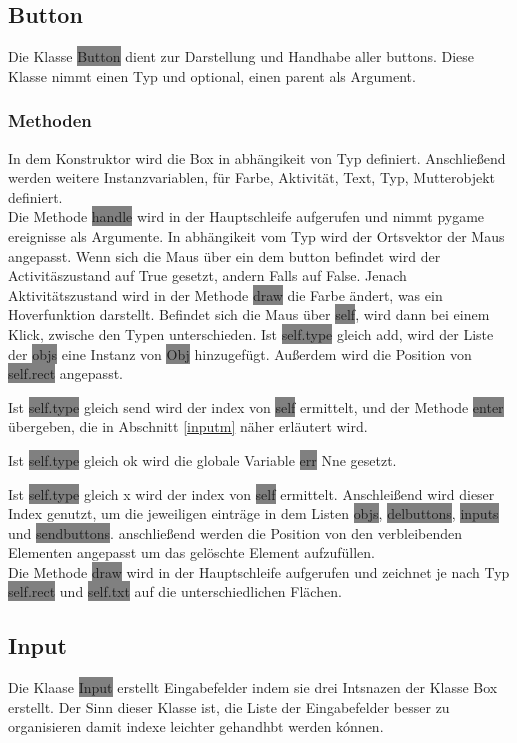 \documentclass[12pt]{article}
\begin{document}
\subsection{Button}
Die Klasse \colorbox{gray}{Button} dient zur Darstellung und Handhabe aller buttons.
Diese Klasse nimmt einen Typ und optional, einen parent als Argument.
\subsubsection{Methoden}
In dem Konstruktor wird die Box in abhängikeit von Typ definiert.
Anschließend werden weitere Instanzvariablen, für Farbe, Aktivität, Text, Typ, Mutterobjekt definiert.
\\

Die Methode \colorbox{gray}{handle} wird in der Hauptschleife aufgerufen und nimmt pygame ereignisse als Argumente.
In abhängikeit vom Typ wird der Ortsvektor der Maus angepasst.
Wenn sich die Maus über ein dem button befindet wird der Activitäszustand auf True gesetzt, andern Falls auf False.
Jenach Aktivitätszustand wird in der Methode \colorbox{gray}{draw} die Farbe ändert, was ein Hoverfunktion darstellt.
Befindet sich die Maus über \colorbox{gray}{self}, wird dann bei einem Klick, zwische den Typen unterschieden.
Ist \colorbox{gray}{self.type} gleich add, wird der Liste der \colorbox{gray}{objs} eine Instanz von \colorbox{gray}{Obj} hinzugefügt.
Außerdem wird die Position von \colorbox{gray}{self.rect} angepasst.

Ist \colorbox{gray}{self.type} gleich send wird der index von \colorbox{gray}{self} ermittelt, und der Methode \colorbox{gray}{enter} übergeben, die in Abschnitt \ref{inputm} näher erläutert wird.

Ist \colorbox{gray}{self.type} gleich ok wird die globale Variable \colorbox{gray}{err} Nne gesetzt.

Ist \colorbox{gray}{self.type} gleich x wird der index von \colorbox{gray}{self} ermittelt.
Anschleißend wird dieser Index genutzt, um die jeweiligen einträge in dem Listen \colorbox{gray}{objs}, \colorbox{gray}{delbuttons}, \colorbox{gray}{inputs} und \colorbox{gray}{sendbuttons}.
anschließend werden die Position von den verbleibenden Elementen angepasst um das gelöschte Element aufzufüllen.
\\

Die Methode \colorbox{gray}{draw} wird in der Hauptschleife aufgerufen und zeichnet je nach Typ \colorbox{gray}{self.rect} und \colorbox{gray}{self.txt} auf die unterschiedlichen Flächen.
\subsection{Input}
Die Klaase \colorbox{gray}{Input} erstellt Eingabefelder indem sie drei Intsnazen der Klasse Box erstellt.
Der Sinn dieser Klasse ist, die Liste der Eingabefelder besser zu organisieren damit indexe leichter gehandhbt werden kónnen.
\end{document}

